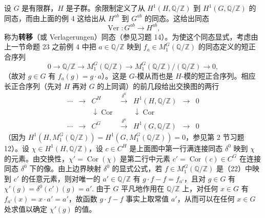 设 \(G\) 是有限群，\(H\) 是子群。余限制定义了从 \(H^1(H, \mathbb{Q}/\mathbb{Z})\) 到 \(H^1(G, \mathbb{Q}/\mathbb{Z})\) 的同态，而由上面的例 4 这给出从 \(H^{ab}\) 到 \(G^{ab}\) 的同态。这给出同态
\[
\operatorname{Ver} : G^{ab} \to H^{ab},
\]
称为\textbf{转移}（或 Verlagerungen）同态（参见习题 14）。为使这个同态显式，考虑由上一节命题 23 之前例 4 中把 \(a \in \mathbb{Q}/\mathbb{Z}\) 映到 \(f_a \in M_1^G(\mathbb{Q}/\mathbb{Z})\) 的同态定义的短正合序列
\[
0 \to \mathbb{Q}/\mathbb{Z} \to M_1^G(\mathbb{Q}/\mathbb{Z}) \to M_1^G(\mathbb{Q}/\mathbb{Z})/(\mathbb{Q}/\mathbb{Z}) \to 0, \tag{17.22}
\]
（故对 \(g \in G\) 有 \(f_a(g) = g \cdot a\)）。这是 \(G\)-模从而也是 \(H\)-模的短正合序列。相应长正合序列（先对 \(H\) 再对 \(G\) 的上同调）的前几段给出交换图的两行
\[
\begin{array}{ccccccc}
\cdots & \to & C^H & \xrightarrow{\delta^0} & H^1(H, \mathbb{Q}/\mathbb{Z}) & \to & 0\\
& & \downarrow\operatorname{Cor} & & \downarrow\operatorname{Cor} & & \\
\cdots & \to & C^G & \xrightarrow{\delta^0} & H^1(G, \mathbb{Q}/\mathbb{Z}) & \to & 0
\end{array}
\]
（因为 \(H^1(H, M_1^G(\mathbb{Q}/\mathbb{Z})) = H^1(G, M_1^G(\mathbb{Q}/\mathbb{Z})) = 0\)，参见第 2 节习题 12）。设 \(\chi \in H^1(H, \mathbb{Q}/\mathbb{Z})\)，设 \(c \in C^H\) 是上面图中第一行满连接同态 \(\delta^0\) 映到 \(\chi\) 的元素。由交换性，\(\chi' = \operatorname{Cor}(\chi)\) 是第二行中元素 \(c' = \operatorname{Cor}(c) \in C^G\) 在连接同态 \(\delta^0\) 下的像。由上边界映射 \(\delta^0\) 的显式公式，若 \(f \in M_1^G(\mathbb{Q}/\mathbb{Z})\) 是（22）中映到 \(c'\) 的任意元素，则对唯一的 \(a' \in \mathbb{Q}/\mathbb{Z}\) 有 \(g \cdot f-f = f_{a'}\)，且对 \(g \in G\) 有 \(\chi'(g) = \delta^0(c')(g) = a'\). 由于 \(G\) 平凡地作用在 \(\mathbb{Q}/\mathbb{Z}\) 上，对任何 \(x \in G\) 有 \(f_{a'}(x) = x \cdot a' = a'\)，故函数 \(g \cdot f-f\) 事实上取常值 \(a'\)，从而可以在任何 \(x \in G\) 处求值以确定 \(\chi'(g)\) 的值。

